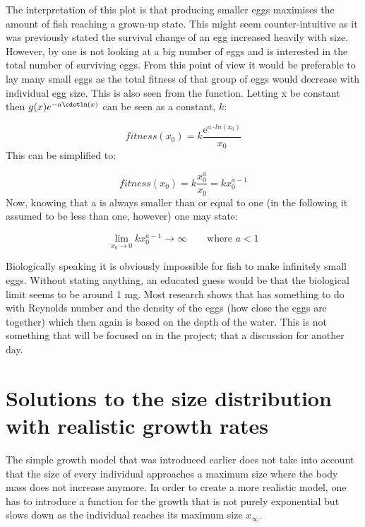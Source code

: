 \documentclass{article}
\numberwithin{equation}{section} %
\newcommand{\me}{\mathrm{e}}
\begin{document}
The interpretation of this plot is that producing smaller eggs maximises the amount of fish reaching a grown-up state. This might seem counter-intuitive as it was previously stated the survival change of an egg increased heavily with size. However, by one is not looking at a big number of eggs and is interested in the total number of surviving eggs. From this point of view it would be preferable to lay many small eggs as the total fitness of that group of eggs would decrease with individual egg size. This is also seen from the function. Letting x be constant then $g(x)e^{-a\cdotln(x)}$ can be seen as a constant, $k$:

\begin{equation}
    fitness(x_0) = k\dfrac{\me^{a\cdot ln(x_0)}}{x_0}
\end{equation}
This can be simplified to:

\begin{equation}
    fitness(x_0) = k\dfrac{x_0^a}{x_0}=kx_0^{a-1}
\end{equation}
Now, knowing that a is always smaller than or equal to one (in the following it assumed to be less than one, however) one may state:

\begin{equation}
    \lim_{x_0 \to 0} kx_0^{a-1} \rightarrow \infty \qquad \textrm{where } a<1
\end{equation}

Biologically speaking it is obviously impossible for fish to make infinitely small eggs. Without stating anything, an educated guess would be that the biological limit seems to be around 1 mg. Most research shows that   has something to do with Reynolds number and the density of the eggs (how close the eggs are together) which then again is based on the depth of the water. This is not something that will be focused on in the project; that a discussion for another day.
\newpage
\section{Solutions to the size distribution with realistic growth rates}\label{sec:Ex6}
The simple growth model that was introduced earlier does not take into account that the size of every individual approaches a maximum
size where the body mass does not increase anymore. In order to create a more realistic model, one has to introduce a function for the growth
that is not purely exponential but slows down as the individual reaches its maximum size $x_\infty$.
\end{document}

